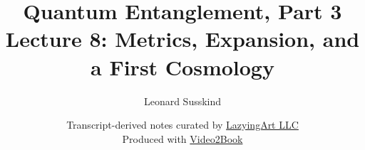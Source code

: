 \documentclass[11pt,oneside]{book}
\begin{document}
\hypersetup{pageanchor=false}
\frontmatter
\title{Quantum Entanglement, Part 3\\[0.45em]
\large Lecture 8: Metrics, Expansion, and a First Cosmology}
\author{Leonard Susskind}
\date{Transcript-derived notes curated by
\href{https://lazying.art}{LazyingArt LLC}\\[0.35em]
\small Produced with
\href{https://github.com/lachlanchen/Video2Book}{Video2Book}}
\maketitle
\hypersetup{pageanchor=true}
\mainmatter

\end{document}
